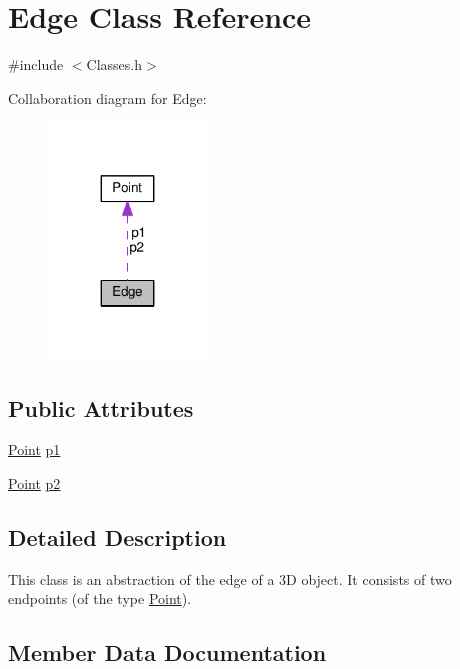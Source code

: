 \hypertarget{class_edge}{}\section{Edge Class Reference}
\label{class_edge}


{\ttfamily \#include $<$Classes.\+h$>$}



Collaboration diagram for Edge\+:
\nopagebreak
\begin{figure}[H]
\begin{center}
\leavevmode
\includegraphics[width=119pt]{class_edge__coll__graph}
\end{center}
\end{figure}
\subsection*{Public Attributes}
\begin{DoxyCompactItemize}
\item 
\hyperlink{class_point}{Point} \hyperlink{class_edge_a9cb958550d6ca42fd7122235d64898c9}{p1}
\item 
\hyperlink{class_point}{Point} \hyperlink{class_edge_a0867d7b428491ef61eb90b540a73db1d}{p2}
\end{DoxyCompactItemize}


\subsection{Detailed Description}
This class is an abstraction of the edge of a 3D object. It consists of two endpoints (of the type \hyperlink{class_point}{Point}). 

\subsection{Member Data Documentation}
